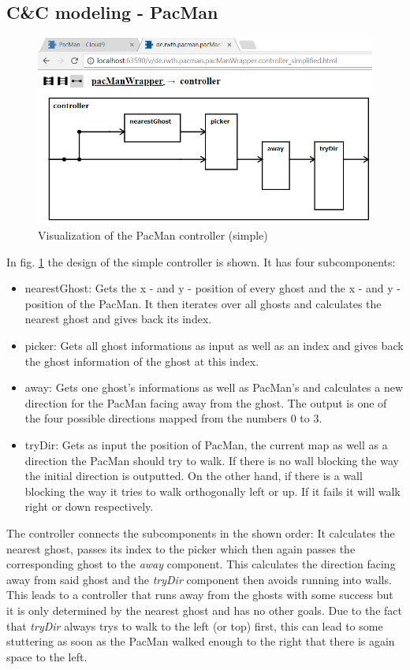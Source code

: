 \subsection{C\&C modeling - PacMan}
\begin{figure}
	\label{fig:visPacmanSimple}
	\centering
	\includegraphics[scale=0.7]{pictures/VisualizationPacManSimple.png}
	\caption{Visualization of the PacMan controller (simple)}
\end{figure}
In fig. \ref{fig:visPacmanSimple} the design of the simple controller is shown. It has four subcomponents:
\begin{itemize}
	\item nearestGhost: Gets the x - and y - position of every ghost and the x - and y - position of the PacMan. It then iterates over all ghosts and calculates the nearest ghost and gives back its index.
	\item picker: Gets all ghost informations as input as well as an index and gives back the ghost information of the ghost at this index.
	\item away: Gets one ghost's informations as well as PacMan's and calculates a new direction for the PacMan facing away from the ghost. The output is one of the four possible directions mapped from the numbers 0 to 3.
	\item tryDir: Gets as input the position of PacMan, the current map as well as a direction the PacMan should try to walk. If there is no wall blocking the way the initial direction is outputted. On the other hand, if there is a wall blocking the way it tries to walk orthogonally left or up. If it fails it will walk right or down respectively.
\end{itemize}
The controller connects the subcomponents in the shown order: It calculates the nearest ghost, passes its index to the picker which then again passes the corresponding ghost to the \textit{away} component. This calculates the direction facing away from said ghost and the \textit{tryDir} component then avoids running into walls. This leads to a controller that runs away from the ghosts with some success but it is only determined by the nearest ghost and has no other goals. Due to the fact that \textit{tryDir} always trys to walk to the left (or top) first, this can lead to some stuttering as soon as the PacMan walked enough to the right that there is again space to the left.
